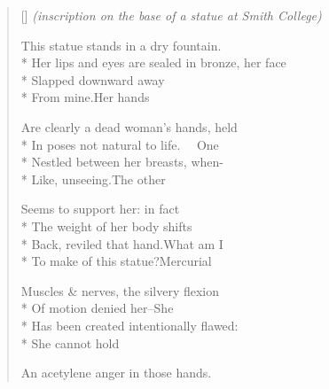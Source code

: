 \label{ch:in_memory_of_a_beautiful}
\settowidth{\versewidth}{Her lips and eyes are sealed in bronze, her face}
\begin{verse}[\versewidth]
\textit{(inscription on the base of a statue at Smith College)}

This statue stands in a dry fountain.\\*
Her lips and eyes are sealed in bronze, her face\\*
Slapped downward away\\*
From mine.\qquad Her hands

Are clearly a dead woman's hands, held\\*
In poses not natural to life.   One\\*
Nestled between her breasts, when-\\*
Like, unseeing.\qquad The other

Seems to support her: in fact\\*
The weight of her body shifts\\*
Back, reviled that hand.\qquad What am I\\*
To make of this statue?\qquad Mercurial

Muscles \& nerves, the silvery flexion\\*
Of motion denied her--\qquad She\\*
Has been created intentionally flawed:\\*
She cannot hold

An acetylene anger in those hands.
\end{verse}
